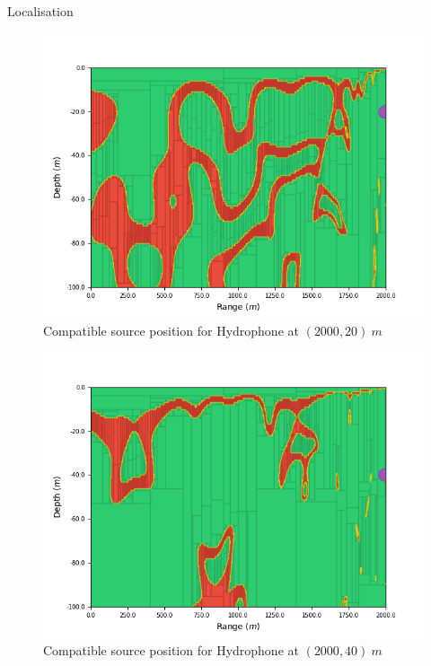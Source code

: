 \documentclass[9pt, xcolor={usenames, dvipsnames}]{beamer}
\begin{document}
\begin{frame}{Localisation}
\begin{minipage}[t][0.7\textheight][t]{0.48\textwidth}
\begin{overprint}
								\begin{figure}
									\centering
									\includegraphics[width=\textwidth]{images/localisation/Hydrophone_20_2000.png}
									\caption{Compatible source position for Hydrophone at $(2000, 20)\ m$}
								\end{figure}
								\begin{figure}
									\centering
									\includegraphics[width=\textwidth]{images/localisation/Hydrophone_40_2000.png}
									\caption{Compatible source position for Hydrophone at $(2000, 40)\ m$}
								\end{figure}
								\begin{figure}

\end{figure}
\end{overprint}
\end{minipage}
\end{frame}
\end{document}
